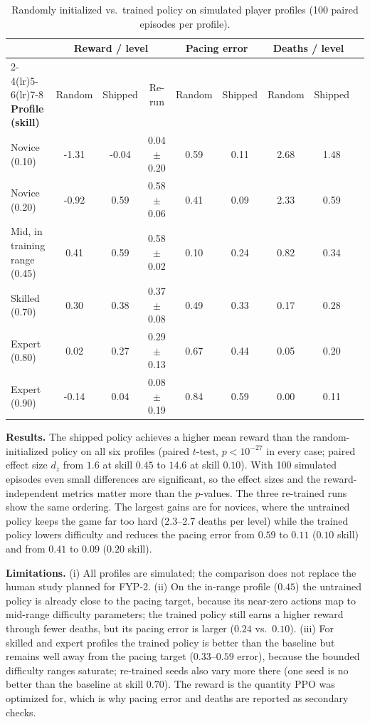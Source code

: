 \begin{table}[!htbp]
\centering
\caption{Randomly initialized vs.\ trained policy on simulated player profiles (100 paired episodes per profile).}
\label{tab:policy_eval}
\scriptsize
\begin{tabular}{p{}cccccccc}
\toprule
& \multicolumn{3}{c}{\textbf{Reward / level}} & \multicolumn{2}{c}{\textbf{Pacing error}} & \multicolumn{2}{c}{\textbf{Deaths / level}} \\
\cmidrule(lr){2-4}\cmidrule(lr){5-6}\cmidrule(lr){7-8}
\textbf{Profile (skill)} & Random & Shipped & Re-run & Random & Shipped & Random & Shipped \\
\midrule
Novice (0.10) & -1.31 & -0.04 & 0.04$\pm$0.20 & 0.59 & 0.11 & 2.68 & 1.48 \\
\midrule
Novice (0.20) & -0.92 & 0.59 & 0.58$\pm$0.06 & 0.41 & 0.09 & 2.33 & 0.59 \\
\midrule
Mid, in training range (0.45) & 0.41 & 0.59 & 0.58$\pm$0.02 & 0.10 & 0.24 & 0.82 & 0.34 \\
\midrule
Skilled (0.70) & 0.30 & 0.38 & 0.37$\pm$0.08 & 0.49 & 0.33 & 0.17 & 0.28 \\
\midrule
Expert (0.80) & 0.02 & 0.27 & 0.29$\pm$0.13 & 0.67 & 0.44 & 0.05 & 0.20 \\
\midrule
Expert (0.90) & -0.14 & 0.04 & 0.08$\pm$0.19 & 0.84 & 0.59 & 0.00 & 0.11 \\
\bottomrule
\end{tabular}
\end{table}

\textbf{Results.} The shipped policy achieves a higher mean reward than the random-initialized policy on all six profiles (paired $t$-test, $p<10^{-27}$ in every case; paired effect size $d_z$ from $1.6$ at skill $0.45$ to $14.6$ at skill $0.10$). With 100 simulated episodes even small differences are significant, so the effect sizes and the reward-independent metrics matter more than the $p$-values. The three re-trained runs show the same ordering. The largest gains are for novices, where the untrained policy keeps the game far too hard (2.3--2.7 deaths per level) while the trained policy lowers difficulty and reduces the pacing error from $0.59$ to $0.11$ ($0.10$ skill) and from $0.41$ to $0.09$ ($0.20$ skill).

\textbf{Limitations.} (i) All profiles are simulated; the comparison does not replace the human study planned for FYP-2. (ii) On the in-range profile ($0.45$) the untrained policy is already close to the pacing target, because its near-zero actions map to mid-range difficulty parameters; the trained policy still earns a higher reward through fewer deaths, but its pacing error is larger ($0.24$ vs.\ $0.10$). (iii) For skilled and expert profiles the trained policy is better than the baseline but remains well away from the pacing target ($0.33$--$0.59$ error), because the bounded difficulty ranges saturate; re-trained seeds also vary more there (one seed is no better than the baseline at skill $0.70$). The reward is the quantity PPO was optimized for, which is why pacing error and deaths are reported as secondary checks.

